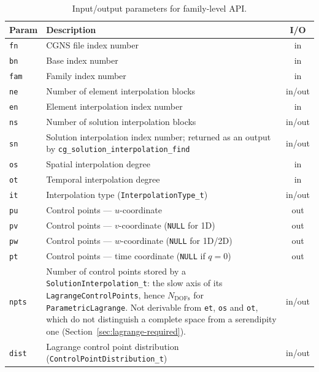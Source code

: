 \documentclass[11pt,letterpaper]{article}
\newif\ifvfourdraft
\newcommand{\vfour}[1]{\ifvfourdraft\textcolor{v4violet}{#1}\else#1\fi}
\begin{document}
\begin{table}[htbp]
\centering
\small
{}
\begin{tabular}{@{} l p{} c @{}}
\toprule
\textbf{Param} & \textbf{Description} & \textbf{I/O} \\
\midrule
\texttt{fn}   & CGNS file index number & in \\
\texttt{bn}   & Base index number & in \\
\texttt{fam}  & Family index number & in \\
\texttt{ne}   & Number of element interpolation blocks & in/out \\
\texttt{en}   & Element interpolation index number & in \\
\texttt{ns}   & Number of solution interpolation blocks & in/out \\
\texttt{sn}   & Solution interpolation index number; returned as an output by
  \texttt{cg\_solution\_interpolation\_find} & in/out \\
\texttt{os}   & Spatial interpolation degree & in \\
\texttt{ot}   & Temporal interpolation degree & in \\
\texttt{it}   & Interpolation type (\texttt{InterpolationType\_t}) & in/out \\
\texttt{pu}   & Control points --- $u$-coordinate & out \\
\texttt{pv}   & Control points --- $v$-coordinate (\texttt{NULL} for 1D) & out \\
\texttt{pw}   & Control points --- $w$-coordinate (\texttt{NULL} for 1D/2D) & out \\
\texttt{pt}    & Control points --- time coordinate (\texttt{NULL} if $q=0$) & out \\
\vfour{\texttt{npts}} & \vfour{Number of control points stored by a
  \texttt{SolutionInterpolation\_t}: the slow axis of its
  \texttt{LagrangeControlPoints}, hence $N_\mathrm{DOFs}$ for
  \texttt{ParametricLagrange}.  Not derivable from \texttt{et}, \texttt{os} and
  \texttt{ot}, which do not distinguish a complete space from a serendipity one
  (Section~\ref{sec:lagrange-required}).} & \vfour{in/out} \\
\texttt{dist} & Lagrange control point distribution (\texttt{ControlPointDistribution\_t}) & in/out \\
\bottomrule
\end{tabular}
\caption{Input/output parameters for family-level API.}
\end{table}
\end{document}
